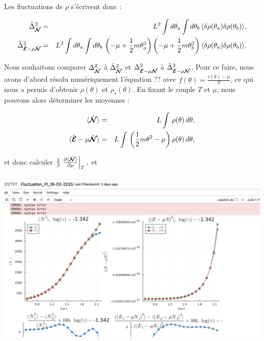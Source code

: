 Les fluctuations de \( \rho \) s'écrivent donc :

\begin{eqnarray*}
    \tilde{\Delta}_{\hat{\bm{\mathcal{N}}}}^2 &=& L^2 \int d\theta_a \int d\theta_b \, \langle \delta \rho(\theta_a) \delta \rho(\theta_b) \rangle, \\
    \tilde{\Delta}_{\hat{\bm{\mathcal{E}}} - \mu \hat{\bm{\mathcal{N}}}}^2 &=& L^2 \int d\theta_a \int d\theta_b \, \left( - \mu + \frac{1}{2} m \theta_a^2 \right) \left( - \mu + \frac{1}{2} m \theta_b^2 \right) \langle \delta \rho(\theta_a) \delta \rho(\theta_b) \rangle.
\end{eqnarray*}

Nous souhaitons comparer \( \Delta_{\hat{\bm{\mathcal{N}}}}^2 \) à \( \tilde{\Delta}_{\hat{\bm{\mathcal{N}}}}^2 \) et \( \Delta_{\hat{\bm{\mathcal{E}}} - \mu \hat{\bm{\mathcal{N}}}}^2 \) à \( \tilde{\Delta}_{\hat{\bm{\mathcal{E}}} - \mu \hat{\bm{\mathcal{N}}}}^2 \). Pour ce faire, nous avons d'abord résolu numériquement l'équation {??} avec \( f(\theta) = \frac{\epsilon(\theta) - \mu}{T} \), ce qui nous a permis d'obtenir \( \rho(\theta) \) et \( \rho_s(\theta) \). En fixant le couple \( T \) et \( \mu \), nous pouvons alors déterminer les moyennes :

\begin{eqnarray*}
    \langle \hat{\bm{\mathcal{N}}} \rangle &=& L \int \, \rho(\theta) \, d\theta, \\
    \langle \hat{\bm{\mathcal{E}}} - \mu \hat{\bm{\mathcal{N}}} \rangle &=& L \int \, \left( \frac{1}{2} m \theta^2 - \mu \right) \rho(\theta) \, d\theta,
\end{eqnarray*}

et donc calculer $\frac{1}{\beta} \left. \frac{\partial \langle \hat{\bm{\mathcal{N}}} \rangle}{\partial \mu} \right|_T,$ et 


\includegraphics[width=1\textwidth]{Figures/test}

